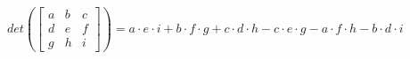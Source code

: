 \documentclass[10pt,convert]{standalone}
\begin{document}
$ det (\begin{bmatrix}
	a  & b & c\\
	d  & e & f\\
	g  & h & i
\end{bmatrix}) = a \cdot e \cdot i + b \cdot f \cdot g + c \cdot d \cdot h - c \cdot e \cdot g - a \cdot f \cdot h - b \cdot d \cdot i $
\end{document}

